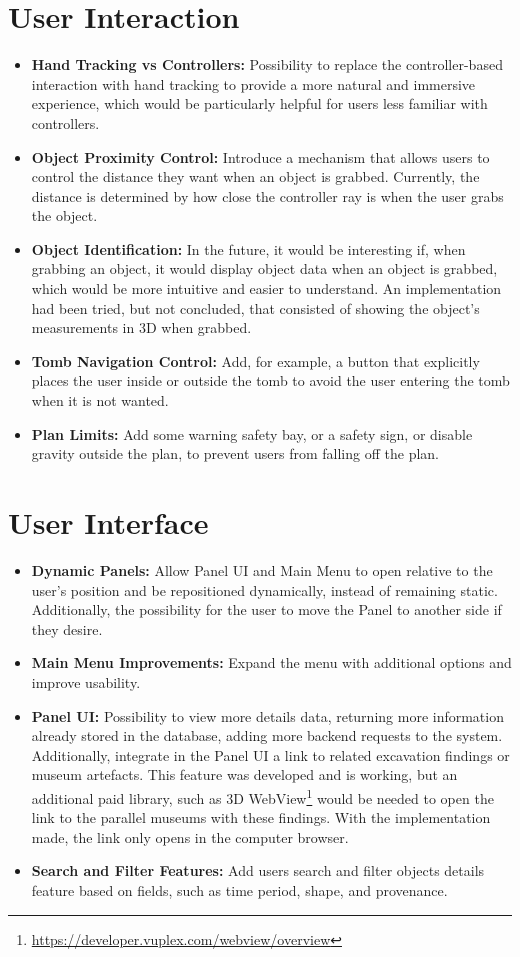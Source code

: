 \section*{User Interaction}
\begin{itemize}
    \item \textbf{Hand Tracking vs Controllers:} Possibility to replace the controller-based interaction with hand tracking to provide a more natural and immersive experience, which would be particularly helpful for users less familiar with controllers.
    \item \textbf{Object Proximity Control:} Introduce a mechanism that allows users to control the distance they want when an object is grabbed. Currently, the distance is determined by how close the controller ray is when the user grabs the object.
    \item \textbf{Object Identification:} In the future, it would be interesting if, when grabbing an object, it would display object data when an object is grabbed, which would be more intuitive and easier to understand. An implementation had been tried, but not concluded, that consisted of showing the object's measurements in \gls{3D} when grabbed.
    \item \textbf{Tomb Navigation Control:} Add, for example, a button that explicitly places the user inside or outside the tomb to avoid the user entering the tomb when it is not wanted.
    \item \textbf{Plan Limits:} Add some warning safety bay, or a safety sign, or disable gravity outside the plan, to prevent users from falling off the plan.
\end{itemize}   

\section*{User Interface}
\begin{itemize}
    \item \textbf{Dynamic Panels:} Allow Panel \gls{UI} and Main Menu to open relative to the user’s position and be repositioned dynamically, instead of remaining static. Additionally, the possibility for the user to move the Panel to another side if they desire.
    \item \textbf{Main Menu Improvements:} Expand the menu with additional options and improve usability.
    \item \textbf{Panel UI:} Possibility to view more details data, returning more information already stored in the database, adding more backend requests to the system. Additionally, integrate in the Panel \gls{UI} a link to related excavation findings or museum artefacts. This feature was developed and is working, but an additional paid library, such as \gls{3D} WebView\footnote{\url{https://developer.vuplex.com/webview/overview}} would be needed to open the link to the parallel museums with these findings. With the implementation made, the link only opens in the computer browser.
    \item \textbf{Search and Filter Features:} Add users search and filter objects details feature based on fields, such as time period, shape, and provenance.
\end{itemize}

